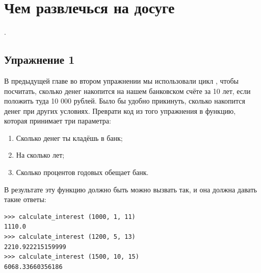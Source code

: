 
\vspace{6pt}

\section{Чем развлечься на досуге}

.

\subsection*{Упражнение 1}
В предыдущей главе во втором упражнении мы использовали цикл , чтобы посчитать, сколько денег накопится на нашем банковском счёте за 10 лет, если положить туда 10 000 рублей. Было бы удобно прикинуть, сколько накопится денег при других условиях. Преврати код из того упражнения в функцию, которая принимает три параметра:

\begin{enumerate}
\item Сколько денег ты кладёшь в банк;
\item На сколько лет;
\item Сколько процентов годовых обещает банк.
\end{enumerate}

В результате эту функцию должно быть можно вызвать так, и она должна давать такие ответы:

\begin{listing}
\begin{verbatim}
>>> calculate_interest (1000, 1, 11)
1110.0
>>> calculate_interest (1200, 5, 13)
2210.922215159999
>>> calculate_interest (1500, 10, 15)
6068.33660356186
\end{verbatim}
\end{listing}

